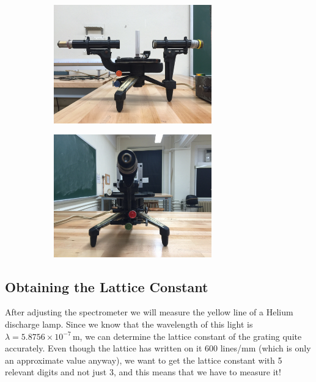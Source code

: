 \begin{figure}
\centering
\begin{subfigure}[b]{\textwidth}
  \includegraphics[width=0.75\textwidth]{./Exp9/pic/spectroside.jpg}
\end{subfigure}

\begin{subfigure}[b]{\textwidth}
  \includegraphics[width=0.75\textwidth]{./Exp9/pic/spectrofront.jpg}
\end{subfigure}
\end{figure}

\subsection{Obtaining the Lattice Constant}
 After adjusting the spectrometer we will measure the yellow line of a Helium discharge lamp. Since we know that the wavelength of this light is $\lambda = 5.8756\times 10^{-7}\,\mathrm{m}$, we can determine the lattice constant of the grating quite accurately. Even though the lattice has written on it 600 lines/mm (which is only an approximate value anyway), we want to get the lattice constant with 5 relevant digits and not just 3, and this means that we have to measure it!

